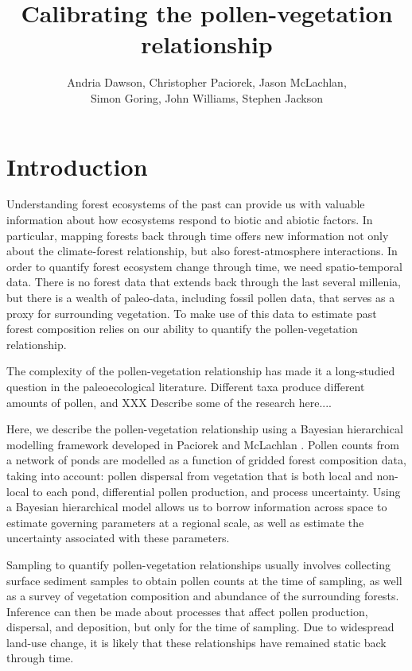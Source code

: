 \documentclass[12pt]{article}
\begin{document}
\nocite{*}

\title{Calibrating the pollen-vegetation relationship}

\author{Andria Dawson, Christopher Paciorek, Jason McLachlan,\\ Simon Goring, John Williams, Stephen Jackson}

\maketitle

\section{Introduction}

Understanding forest ecosystems of the past can provide us with
valuable information about how ecosystems respond to biotic and
abiotic factors. In particular, mapping forests back through time
offers new information not only about the climate-forest relationship,
but also forest-atmosphere interactions. In order to quantify forest
ecosystem change through time, we need spatio-temporal data. There is
no forest data that extends back through the last several millenia,
but there is a wealth of paleo-data, including fossil pollen data,
that serves as a proxy for surrounding vegetation. To make use of this
data to estimate past forest composition relies on our ability to
quantify the pollen-vegetation relationship. 

The complexity of the pollen-vegetation relationship has made it a
long-studied question in the paleoecological literature. Different
taxa produce different amounts of pollen, and XXX Describe some of the
research here....

Here, we describe the pollen-vegetation relationship using a Bayesian
hierarchical modelling framework developed in Paciorek and McLachlan
\cite{XXX}. Pollen counts from a network of ponds are modelled as a
function of gridded forest composition data, taking into account:
pollen dispersal from vegetation that is both local and non-local to
each pond, differential pollen production, and process
uncertainty. Using a Bayesian hierarchical model allows us to borrow
information across space to estimate governing parameters at a
regional scale, as well as estimate the uncertainty associated with
these parameters.

Sampling to quantify pollen-vegetation relationships usually involves
collecting surface sediment samples to obtain pollen counts at the
time of sampling, as well as a survey of vegetation composition and
abundance of the surrounding forests. Inference can then be made about
processes that affect pollen production, dispersal, and deposition,
but only for the time of sampling. Due to widespread land-use change,
it is likely that these relationships have remained static back
through time.
\end{document}
